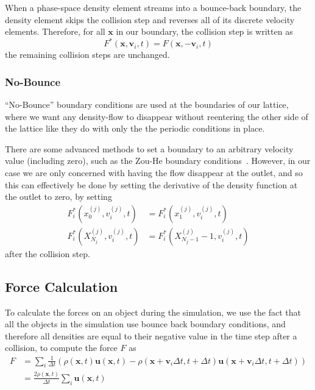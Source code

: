 When a phase-space density element streams into a bounce-back boundary, the density element skips the collision step and reverses all of its discrete velocity elements. Therefore, for all $\mathbf x$ in our boundary, the collision step is written as
\begin{equation}
  F^{*}(\mathbf x, \mathbf v_{i}, t)
  = F(\mathbf x, - \mathbf v_{i}, t)
\end{equation}
the remaining collision steps are unchanged.


\subsubsection{No-Bounce}
``No-Bounce'' boundary conditions are used at the boundaries of our lattice, where we want any density-flow to disappear without reentering the other side of the lattice like they do with only the the periodic conditions in place.

There are some advanced methods to set a boundary to an arbitrary velocity value (including zero), such as the Zou-He boundary conditions~\cite{zou_pressure_1997}.
However, in our case we are only concerned with having the flow disappear at the outlet, and so this can effectively be done by setting the derivative of the density function at the outlet to zero, by setting~\cite{mei_lattice_2000}
\begin{align}
  F^{*}_{i}\left(x^{(j)}_{0}, v^{(j)}_{i}, t\right)
  &= F^{*}_{i}\left(x^{(j)}_{1},  v^{(j)}_{i}, t\right) \\
  F^{*}_{i}\left(X^{(j)}_{N_{j}}, v^{(j)}_{i}, t\right)
  &= F^{*}_{i}\left(X^{(j)}_{N_{j} - 1} - 1, v^{(j)}_{i}, t\right)
\end{align}
after the collision step.

\subsection{Force Calculation}
To calculate the forces on an object during the simulation, we use the fact that all the objects in the simulation use bounce back boundary conditions, and therefore all densities are equal to their negative value in the time step after a collision, to compute the force $F$ as~\cite{schalkers_momentum_2024}
\begin{align}
  F &= \sum_{i} \frac{1}{\Delta t} (\rho(\mathbf x, t) \mathbf u(\mathbf x, t) - \rho(\mathbf x + \mathbf v_{i} \Delta t, t+\Delta t) \mathbf u(\mathbf x + \mathbf v_{i}\Delta t, t + \Delta t)) \\
  &= \frac{2\rho(\mathbf x, t)}{\Delta t} \sum_{i}  \mathbf u(\mathbf x, t)
\end{align}

